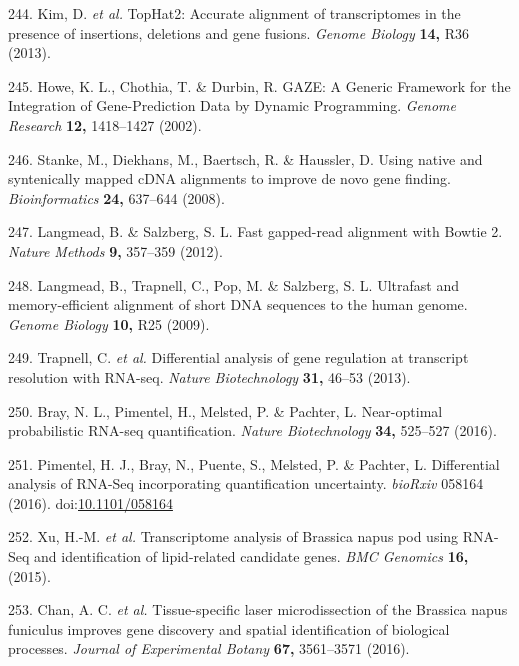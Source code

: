 \documentclass[12pt,]{book}
\begin{document}
\hypertarget{ref-kim_tophat2_2013}{}
244. Kim, D. \emph{et al.} TopHat2: Accurate alignment of transcriptomes
in the presence of insertions, deletions and gene fusions. \emph{Genome
Biology} \textbf{14,} R36 (2013).

\hypertarget{ref-howe_gaze_2002}{}
245. Howe, K. L., Chothia, T. \& Durbin, R. GAZE: A Generic Framework
for the Integration of Gene-Prediction Data by Dynamic Programming.
\emph{Genome Research} \textbf{12,} 1418--1427 (2002).

\hypertarget{ref-stanke_augustus_2008}{}
246. Stanke, M., Diekhans, M., Baertsch, R. \& Haussler, D. Using native
and syntenically mapped cDNA alignments to improve de novo gene finding.
\emph{Bioinformatics} \textbf{24,} 637--644 (2008).

\hypertarget{ref-langmead_bowtie2_2012}{}
247. Langmead, B. \& Salzberg, S. L. Fast gapped-read alignment with
Bowtie 2. \emph{Nature Methods} \textbf{9,} 357--359 (2012).

\hypertarget{ref-langmead_bowtie_2009}{}
248. Langmead, B., Trapnell, C., Pop, M. \& Salzberg, S. L. Ultrafast
and memory-efficient alignment of short DNA sequences to the human
genome. \emph{Genome Biology} \textbf{10,} R25 (2009).

\hypertarget{ref-trapnell_differential_2013}{}
249. Trapnell, C. \emph{et al.} Differential analysis of gene regulation
at transcript resolution with RNA-seq. \emph{Nature Biotechnology}
\textbf{31,} 46--53 (2013).

\hypertarget{ref-bray_kallisto_2016}{}
250. Bray, N. L., Pimentel, H., Melsted, P. \& Pachter, L. Near-optimal
probabilistic RNA-seq quantification. \emph{Nature Biotechnology}
\textbf{34,} 525--527 (2016).

\hypertarget{ref-pimentel_sleuth_2016}{}
251. Pimentel, H. J., Bray, N., Puente, S., Melsted, P. \& Pachter, L.
Differential analysis of RNA-Seq incorporating quantification
uncertainty. \emph{bioRxiv} 058164 (2016).
doi:\href{https://doi.org/10.1101/058164}{10.1101/058164}

\hypertarget{ref-xu_transcriptome_2015}{}
252. Xu, H.-M. \emph{et al.} Transcriptome analysis of Brassica napus
pod using RNA-Seq and identification of lipid-related candidate genes.
\emph{BMC Genomics} \textbf{16,} (2015).

\hypertarget{ref-chan_tissue_specific_2016}{}
253. Chan, A. C. \emph{et al.} Tissue-specific laser microdissection of
the Brassica napus funiculus improves gene discovery and spatial
identification of biological processes. \emph{Journal of Experimental
Botany} \textbf{67,} 3561--3571 (2016).
\end{document}
